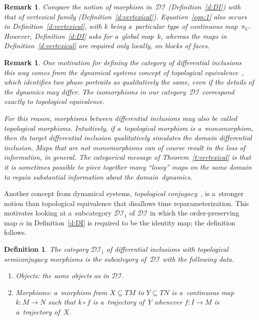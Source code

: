 \documentclass[pdftex]{sigma}
\newtheorem{Definition}[Theorem]{Definition}
\newtheorem{Remark}[Theorem]{Remark}
\begin{document}
\begin{Remark}
\label{r:DI}
Compare the notion of morphism in~$\mathcal{DI}$ (Def\/inition~\ref{d:DI}) with that of vertexical family
(Def\/inition~\ref{d:vertexical}).
Equation~\eqref{eqn:1} also occurs in Def\/inition~\ref{d:vertexical}, with $k$ being a~particular type of continuous
map~$\pi_U$.
However, Def\/inition~\ref{d:DI} asks for a~global map~$k$, whereas the maps in Def\/inition~\ref{d:vertexical} are
required only locally, on blocks of faces.
\end{Remark}
\begin{Remark}
\label{r:topequiv}
One motivation for def\/ining the category of dif\/ferential inclusions this way comes from the dynamical systems
concept of \emph{topological equivalence}~\cite{irwin80smooth}, which identif\/ies two phase portraits as qualitatively
the same, even if the details of the dynamics may dif\/fer.
The isomorphisms in our category~$\mathcal{DI}$ correspond exactly to topological equivalence.

For this reason, morphisms between dif\/ferential inclusions may also be called \emph{topological morphisms}.
Intuitively, if a~topological morphism is a~monomorphism, then its target dif\/ferential inclusion qualitatively
simulates the domain dif\/ferential inclusion.
Maps that are not monomorphisms can of course result in the loss of information, in general.
The categorical message of Theorem~\ref{t:vertexical} is that it is sometimes possible to piece together many ``lossy''
maps on the same domain to regain substantial information about the domain~dynamics.
\end{Remark}

Another concept from dynamical systems, \emph{topological conjugacy}~\cite{irwin80smooth}, is a~stronger notion than
topological equivalence that disallows time reparameterization.
This motivates looking at a~subcategory $\mathcal{DI}_1$ of $\mathcal{DI}$ in which the order-preserving map $\alpha$
in Def\/inition~\ref{d:DI} is required to be the identity map; the def\/inition follows.
\begin{Definition}
\label{def:alphaIs1}
The \emph{category} $\mathcal{DI}_1$ \emph{of differential inclusions with topological semiconjugacy morphisms} is
the subcategory of~$\mathcal{DI}$ with the following data.
\begin{enumerate}\itemsep=0pt
\item Objects: the same objects as in $\mathcal{DI}$.
\item Morphisms: a~morphism from $X\subseteq TM$ to $Y\subseteq TN$ is a~continuous map $k:M\to N$ such that $k\circ f$
is a~trajectory of~$Y$ whenever $f:I\to M$ is a~trajectory of~$X$.
\end{enumerate}
\end{Definition}
\end{document}
